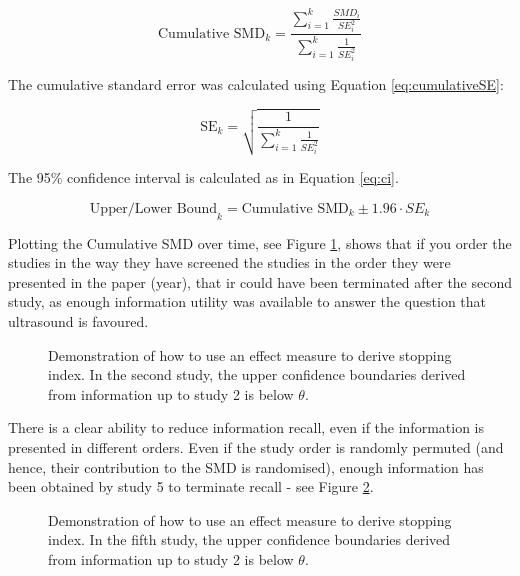 \documentclass[10pt,oneside]{book}
\begin{document}
\begin{equation}
    \text{Cumulative SMD}_k = \frac{\sum^k_{i=1} \frac{SMD_i}{SE^2_i}}{\sum^k_{i=1} \frac{1}{SE^2_i}}
    \label{eq:cumulativeSMD}
\end{equation}

The cumulative standard error was calculated using Equation \ref{eq:cumulativeSE}:

\begin{equation}
    \text{SE}_k = \sqrt{\frac{1}{\sum^k_{i=1} \frac{1}{SE^2_i}}}
    \label{eq:cumulativeSE}
\end{equation}


The 95\% confidence interval is calculated as in Equation \ref{eq:ci}.

\begin{equation}
    \text{Upper/Lower Bound}_k = \text{Cumulative SMD}_k \pm 1.96 \cdot SE_k
    \label{eq:ci}
\end{equation}

Plotting the Cumulative SMD over time, see Figure \ref{fig:culm_smd}, shows that if you order the studies in the way they have screened the studies in the order they were presented in the paper (year), that \gls*{ir} could have been terminated after the second study, as enough information utility was available to answer the question that ultrasound is favoured. 

\begin{figure}
    \centering
    
    \caption{Demonstration of how to use an effect measure to derive stopping index. In the second study, the upper confidence boundaries derived from information up to study 2 is below $\theta$.}
    \label{fig:culm_smd}
\end{figure}

There is a clear ability to reduce information recall, even if the information is presented in different orders. Even if the study order is randomly permuted (and hence, their contribution to the SMD is randomised), enough information has been obtained by study 5 to terminate recall -  see Figure \ref{fig:aggrevated_stop}.

\begin{figure}
    \centering
    
    \caption{Demonstration of how to use an effect measure to derive stopping index. In the fifth study, the upper confidence boundaries derived from information up to study 2 is below $\theta$.}
    \label{fig:aggrevated_stop}
\end{figure}
\end{document}
